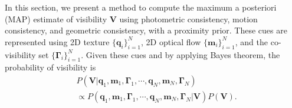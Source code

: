 In this section, we present a method to compute the maximum a posteriori (MAP) estimate of visibility $\mathbf{V}$ using photometric consistency, motion consistency, and geometric consistency, with a proximity prior. These cues are represented using 2D texture $\{ \mathbf{q}_i \}_{i=1}^N$, 2D optical flow $\{ \mathbf{m}_i \}_{i=1}^N$, and the co-visibility set $\{ \mathbf{\Gamma}_i \}_{i=1}^N$. Given these cues and by applying Bayes theorem, the probability of visibility is
\begin{align}
&P( \mathbf{V} | \mathbf{q}_1, \mathbf{m}_1, \mathbf{\Gamma}_1, \cdots, \mathbf{q}_N,  \mathbf{m}_N, \mathbf{\Gamma}_N ) \nonumber\\
&\propto P(\mathbf{q}_1, \mathbf{m}_1, \mathbf{\Gamma}_1, \cdots, \mathbf{q}_N,  \mathbf{m}_N, \mathbf{\Gamma}_N |  \mathbf{V}) P(\mathbf{V}).  \nonumber
\end{align}


